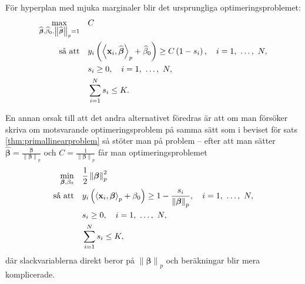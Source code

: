 \documentclass[a4paper, 12pt]{report}
\theoremstyle{definition}
\theoremstyle{remark}
\newcommand{\bfbeta}{{\boldsymbol{\beta}}}
\newcommand{\bfx}{\mathbf{x}}
\newcommand{\llangle}{\left\langle}
\newcommand{\rrangle}{\right\rangle}
\newcommand{\inner}[2]{\llangle #1, #2 \rrangle}
\begin{document}
För hyperplan med mjuka marginaler blir det ursprungliga optimeringsproblemet:
\begin{equation}\label{opt:softmargin}
\begin{aligned}
\operatornamewithlimits{max}_{\widehat{\bfbeta}, \widehat{\beta}_0, \left\|\widehat{\bfbeta}
\right\|_p=1}& & &C\\
\text{så att}& & &y_i\left(\inner{\bfx_i}{\widehat{\bfbeta}}_p+\widehat{\beta}_0\right)\geq C\left(1-s_i\right),\quad i=1,~\dots,~N,\\
& & &s_i\geq0,\quad i=1,~\dots,~N,\\
& & &\sum_{i=1}^{N}s_i \leq K.
\end{aligned}
\end{equation}

En annan orsak till att det andra alternativet föredras är att om man försöker skriva om motsvarande optimeringsproblem på samma sätt som i beviset för sats \ref{thm:primallinearproblem} så stöter man på problem -- efter att man sätter $\widehat{\bfbeta}=\frac{\bfbeta}{\left\|\bfbeta
\right\|_p}$ och $C=\frac{1}{\left\|\bfbeta
\right\|_p}$ får man optimeringsproblemet
\begin{equation*}
\begin{aligned}
\operatornamewithlimits{min}_{\bfbeta, \beta_0} & & &\frac{1}{2}\left\|\bfbeta
\right\|_p^2\\
\text{så att} & & &y_i\left(\inner{\bfx_i}{\bfbeta}_p+\beta_0\right)\geq 1 - \frac{s_i}{\left\|\bfbeta\right\|_p},\quad i=1,~\dots,~N,\\
& & &s_i\geq0,\quad i=1,~\dots,~N,\\
& & &\sum_{i=1}^{N} s_i \leq K,
\end{aligned}
\end{equation*}
där slackvariablerna direkt beror på $\left\|\bfbeta\right\|_p$ och beräkningar blir mera komplicerade.
\end{document}
